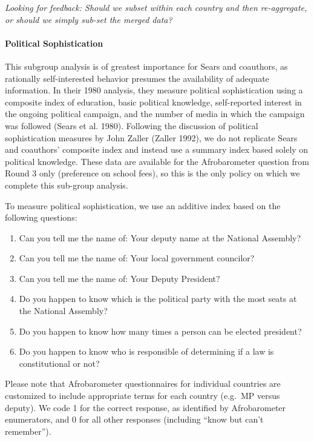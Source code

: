 \documentclass[]{article}
\let\oldparagraph\paragraph
\renewcommand{\paragraph}[1]{\oldparagraph{#1}\mbox{}}
\begin{document}
\textit{Looking for feedback: Should we subset within each country and then re-aggregate, or should we simply sub-set the merged data?}

\paragraph{Political Sophistication}\label{political-sophistication}

This subgroup analysis is of greatest importance for Sears and
coauthors, as rationally self-interested behavior presumes the
availability of adequate information. In their 1980 analysis, they
measure political sophistication using a composite index of education,
basic political knowledge, self-reported interest in the ongoing
political campaign, and the number of media in which the campaign was
followed (Sears et al. 1980). Following the discussion of political
sophistication measures by John Zaller (Zaller 1992), we do not
replicate Sears and coauthors' composite index and instead use a summary
index based solely on political knowledge. These data are available for
the Afrobarometer question from Round 3 only (preference on school
fees), so this is the only policy on which we complete this sub-group
analysis.

To measure political sophistication, we use an additive index based on
the following questions:

\begin{enumerate}
  \item Can you tell me the name of: Your deputy name at the National Assembly?
  \item Can you tell me the name of: Your local government councilor?
  \item Can you tell me the name of: Your Deputy President?
  \item Do you happen to know which is the political party with the most seats at the National Assembly?
  \item Do you happen to know how many times a person can be elected president?
  \item Do you happen to know who is responsible of determining if a law is constitutional or not?
\end{enumerate}

Please note that Afrobarometer questionnaires for individual countries
are customized to include appropriate terms for each country (e.g.~MP
versus deputy). We code 1 for the correct response, as identified by
Afrobarometer enumerators, and 0 for all other responses (including
``know but can't remember'').
\end{document}
